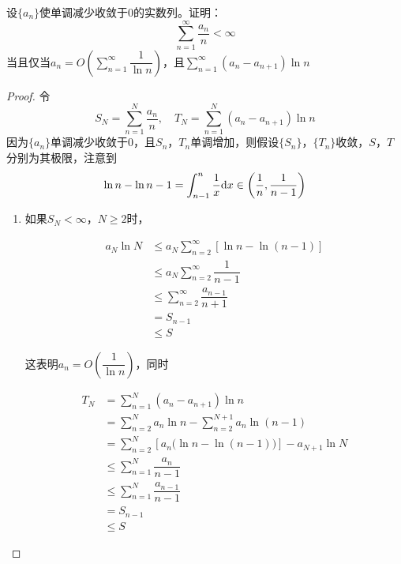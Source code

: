 \begin{proposition}

    设$\{a_n\}$使单调减少收敛于$0$的实数列。证明：
    \[\sum\limits_{n = 1}^{\infty}{\dfrac{a_n}{n}} < \infty\]
    当且仅当$a_n = O\left( \sum\limits_{n = 1}^{\infty}{\dfrac{1}{\ln{n}}} \right)$，且$\sum\limits_{n = 1}^{\infty}{(a_n - a_{n + 1})\ln{n}}$

\end{proposition}

\begin{proof}
    
    令
    \[S_N = \sum\limits_{n = 1}^{N}{\dfrac{a_n}{n}}, \quad T_N = \sum\limits_{n = 1}^{N}{(a_n - a_{n + 1})\ln{n}}\]
    因为$\{a_n\}$单调减少收敛于$0$，且$S_n$，$T_n$单调增加，则假设$\{S_n\}$，$\{T_n\}$收敛，$S$，$T$分别为其极限，注意到
    \[\ln{n} - \ln{n - 1} = \int_{n - 1}^{n}{\dfrac{1}{x}}\mathrm{d} x \in \left( \dfrac{1}{n}, \dfrac{1}{n - 1} \right)\]

    \begin{enumerate}
        
        \item 
            如果$S_N < \infty$，$N \geq 2$时，

            \begin{align*}
                a_N\ln{N} & \leq a_N\sum\limits_{n = 2}^{\infty}{[\ln{n} - \ln{(n - 1)}]} \\
                & \leq a_N \sum\limits_{n = 2}^{\infty}{\dfrac{1}{n - 1}} \\
                & \leq \sum\limits_{n = 2}^{\infty}{\dfrac{a_{n - 1}}{n + 1}} \\
                & = S_{n - 1} \\
                & \leq S
            \end{align*}

            这表明$a_n = O\left( \dfrac{1}{\ln{n}} \right)$，同时

            \begin{align*}
                T_N & = \sum\limits_{n = 1}^{N}{(a_n - a_{n + 1})\ln{n}} \\
                & = \sum\limits_{n = 2}^{N}{a_n\ln{n}} - \sum\limits_{n = 2}^{N + 1}{a_{n}\ln{(n - 1)}} \\
                & = \sum\limits_{n = 2}^{N}{[a_n\big(\ln{n} - \ln(n - 1)\big)]} - a_{N + 1}\ln{N} \\
                & \leq \sum\limits_{n = 1}^{N}{\dfrac{a_{n}}{n - 1}} \\
                & \leq \sum\limits_{n = 1}^{N}{\dfrac{a_{n - 1}}{n - 1}} \\
                & = S_{n - 1} \\
                & \leq S
            \end{align*}


\end{enumerate}
\end{proof}
